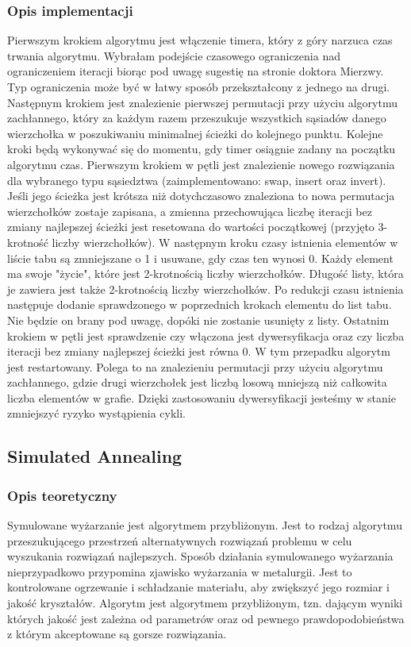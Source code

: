 \documentclass[12pt,a4paper,titlepage]{article}
\begin{document}
\subsubsection{Opis implementacji}
Pierwszym krokiem algorytmu jest włączenie timera, który z góry narzuca czas trwania algorytmu. Wybrałam podejście czasowego ograniczenia nad ograniczeniem iteracji biorąc pod uwagę sugestię na stronie doktora Mierzwy. Typ ograniczenia może być w łatwy sposób przekształcony z jednego na drugi. Następnym krokiem jest znalezienie pierwszej permutacji przy użyciu algorytmu zachłannego, który za każdym razem przeszukuje wszystkich sąsiadów danego wierzchołka w poszukiwaniu minimalnej ścieżki do kolejnego punktu. Kolejne kroki będą wykonywać się do momentu, gdy timer osiągnie zadany na początku algorytmu czas. Pierwszym krokiem w pętli jest znalezienie nowego rozwiązania dla wybranego typu sąsiedztwa (zaimplementowano: swap, insert oraz invert). Jeśli jego ścieżka jest krótsza niż dotychczasowo znaleziona to nowa permutacja wierzchołków zostaje zapisana, a zmienna przechowująca liczbę iteracji bez zmiany najlepszej ścieżki jest resetowana do wartości początkowej (przyjęto 3-krotność liczby wierzchołków). W następnym kroku czasy istnienia elementów w liście tabu są zmniejszane o 1 i usuwane, gdy czas ten wynosi 0. Każdy element ma swoje "życie", które jest 2-krotnością liczby wierzchołków. Długość listy, która je zawiera jest także 2-krotnością liczby wierzchołków. Po redukcji czasu istnienia następuje dodanie sprawdzonego w poprzednich krokach elementu do list tabu. Nie będzie on brany pod uwagę, dopóki nie zostanie usunięty z listy. Ostatnim krokiem w pętli jest sprawdzenie czy włączona jest dywersyfikacja oraz czy liczba iteracji bez zmiany najlepszej ścieżki jest równa 0. W tym przepadku algorytm jest restartowany. Polega to na znalezieniu permutacji przy użyciu algorytmu zachłannego, gdzie drugi wierzchołek jest liczbą losową mniejszą niż całkowita liczba elementów w grafie. Dzięki zastosowaniu dywersyfikacji jesteśmy w stanie zmniejszyć ryzyko wystąpienia cykli.

\subsection{Simulated Annealing}
\subsubsection{Opis teoretyczny}
Symulowane wyżarzanie jest algorytmem przybliżonym. Jest to rodzaj algorytmu przeszukującego przestrzeń alternatywnych rozwiązań problemu w celu wyszukania rozwiązań najlepszych. Sposób działania symulowanego wyżarzania nieprzypadkowo przypomina zjawisko wyżarzania w metalurgii. Jest to kontrolowane ogrzewanie i schładzanie materiału, aby zwiększyć jego rozmiar i jakość
kryształów.  Algorytm jest algorytmem przybliżonym, tzn. dającym wyniki których jakość jest zależna od parametrów oraz od pewnego prawdopodobieństwa z którym akceptowane są gorsze rozwiązania.
\end{document}
